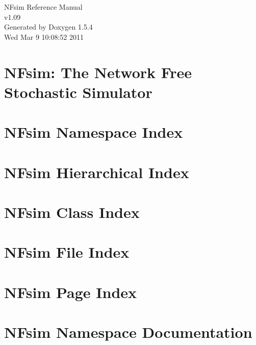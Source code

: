 \documentclass[a4paper]{book}
\begin{document}
\begin{titlepage}
\vspace*{7cm}
\begin{center}
{\Large NFsim Reference Manual\\[1ex]\large v1.09 }\\
\vspace*{1cm}
{\large Generated by Doxygen 1.5.4}\\
\vspace*{0.5cm}
{\small Wed Mar 9 10:08:52 2011}\\
\end{center}
\end{titlepage}
\clearemptydoublepage
{}
\tableofcontents
\clearemptydoublepage
{}
\chapter{NFsim: The Network Free Stochastic Simulator }
\label{index}
\chapter{NFsim Namespace Index}

\chapter{NFsim Hierarchical Index}

\chapter{NFsim Class Index}

\chapter{NFsim File Index}

\chapter{NFsim Page Index}

\chapter{NFsim Namespace Documentation}









\end{document}
